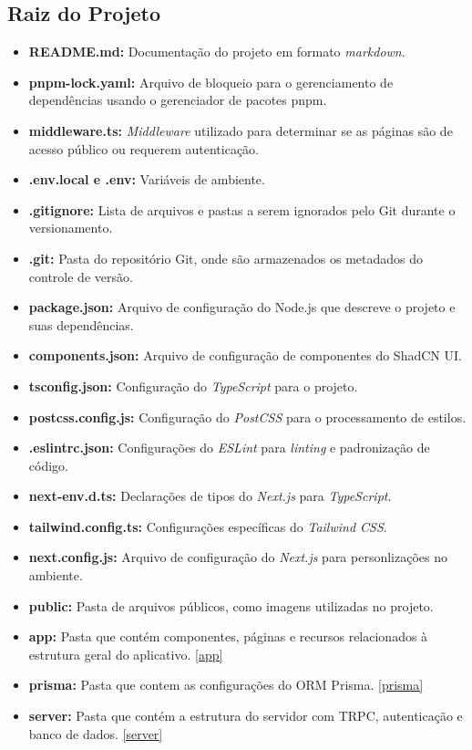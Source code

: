 \subsection{Raiz do Projeto}
\begin{itemize}
\item \textbf{README.md:} Documentação do projeto em formato \textit{markdown}.
\item \textbf{pnpm-lock.yaml:} Arquivo de bloqueio para o gerenciamento de dependências usando o gerenciador de pacotes pnpm.
\item \textbf{middleware.ts:} \textit{Middleware} utilizado para determinar se as páginas são de acesso público ou requerem autenticação.
\item \textbf{.env.local e .env:} Variáveis de ambiente.
\item \textbf{.gitignore:} Lista de arquivos e pastas a serem ignorados pelo Git durante o versionamento.
\item \textbf{.git:} Pasta do repositório Git, onde são armazenados os metadados do controle de versão.
\item \textbf{package.json:} Arquivo de configuração do Node.js que descreve o projeto e suas dependências.
\item \textbf{components.json:} Arquivo de configuração de componentes do ShadCN UI.
\item \textbf{tsconfig.json:} Configuração do \textit{TypeScript} para o projeto.
\item \textbf{postcss.config.js:} Configuração do \textit{PostCSS} para o processamento de estilos.
\item \textbf{.eslintrc.json:} Configurações do \textit{ESLint} para \textit{linting} e padronização de código.
\item \textbf{next-env.d.ts:} Declarações de tipos do \textit{Next.js} para \textit{TypeScript}.
\item \textbf{tailwind.config.ts:} Configurações específicas do \textit{Tailwind CSS}.
\item \textbf{next.config.js:} Arquivo de configuração do \textit{Next.js} para personlizações no ambiente.
\item \textbf{public:} Pasta de arquivos públicos, como imagens utilizadas no projeto.
\item \textbf{app:} Pasta que contém componentes, páginas e recursos relacionados à estrutura geral do aplicativo. \ref{app}
\item \textbf{prisma:} Pasta que contem as configurações do ORM Prisma. \ref{prisma}
\item \textbf{server:} Pasta que contém a estrutura do servidor com TRPC, autenticação e banco de dados. \ref{server}
\end{itemize}

